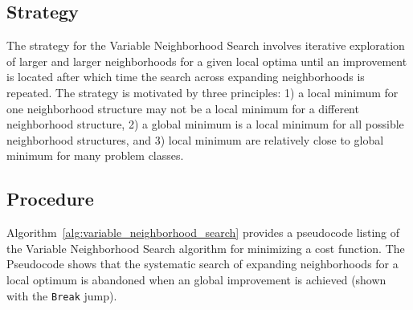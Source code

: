 \subsection{Strategy}
The strategy for the Variable Neighborhood Search involves iterative exploration of larger and larger neighborhoods for a given local optima until an improvement is located after which time the search across expanding neighborhoods is repeated. 
The strategy is motivated by three principles: 1) a local minimum for one neighborhood structure may not be a local minimum for a different neighborhood structure, 2) a global minimum is a local minimum for all possible neighborhood structures, and 3) local minimum are relatively close to global minimum for many problem classes.

\subsection{Procedure}
Algorithm~\ref{alg:variable_neighborhood_search} provides a pseudocode listing of the Variable Neighborhood Search algorithm for minimizing a cost function.
The Pseudocode shows that the systematic search of expanding neighborhoods for a local optimum is abandoned when an global improvement is achieved (shown with the \texttt{Break} jump).

